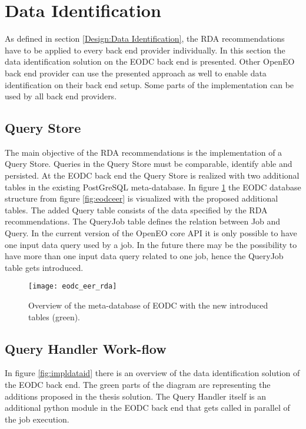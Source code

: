 \documentclass[draft,final]{vutinfth} %
\begin{document}
\section{Data Identification}\label{Implementation:Data Identification}

As defined in section \ref{Design:Data Identification}, the RDA recommendations have to be applied to every back end provider individually. In this section the data identification solution on the EODC back end is presented. Other OpenEO back end provider can use the presented approach as well to enable data identification on their back end setup. Some parts of the implementation can be used by all back end providers.\\

\subsection{Query Store}
The main objective of the RDA recommendations is the implementation of a Query Store. Queries in the Query Store must be comparable, identify able and persisted. At the EODC back end the Query Store is realized with two additional tables in the existing PostGreSQL meta-database. In figure \ref{fig:eer_rda} the EODC database structure from figure \ref{fig:eodceer} is visualized with the proposed additional tables. The added Query table consists of the data specified by the RDA recommendations. The QueryJob table defines the relation between Job and Query. In the current version of the OpenEO core API it is only possible to have one input data query used by a job. In the future there may be the possibility to have more than one input data query related to one job, hence the QueryJob table gets introduced. 

\begin{figure}[h]
	\centering
	\texttt{[image: eodc\_eer\_rda]}
	\caption{Overview of the meta-database of EODC with the new introduced tables (green).}
	\label{fig:eer_rda} %
\end{figure}

\subsection{Query Handler Work-flow}
In figure \ref{fig:impldataid} there is an overview of the data identification solution of the EODC back end. The green parts of the diagram are representing the additions proposed in the thesis solution. The Query Handler itself is an additional python module in the EODC back end that gets called in parallel of the job execution. 
\end{document}

